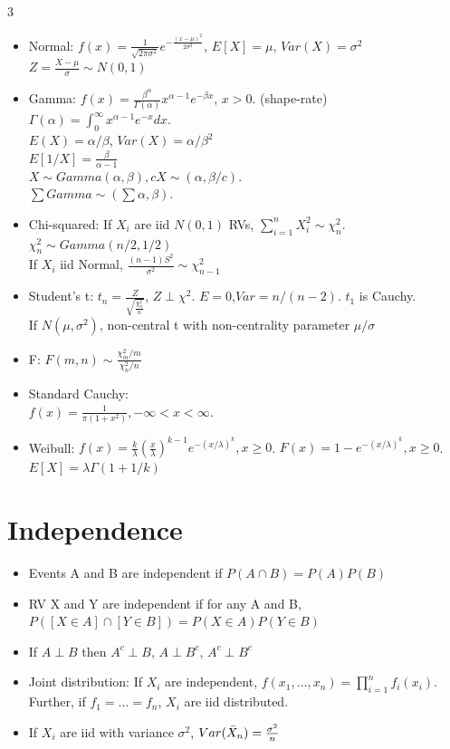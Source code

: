 \documentclass[a4paper,10pt]{article}
\begin{document}
\begin{multicols}{3}
\begin{itemize}
    \item Normal: $f(x)=\frac{1}{\sqrt{2\pi\sigma^2}}e^{-\frac{(x-\mu)^2}{2\sigma^2}}$, $E[X]=\mu$, $Var(X)=\sigma^2$\\
    $Z=\frac{X-\mu}{\sigma}\sim N(0,1)$
    \item Gamma: $f(x)=\frac{\beta^\alpha}{ \Gamma(\alpha)}x^{\alpha-1}e^{-\beta x}$, $x>0$. (shape-rate)\\ $\Gamma(\alpha)=\int_0^\infty x^{\alpha-1}e^{-x}dx$.\\
    $E(X)=\alpha/\beta$, $Var(X)=\alpha/{\beta^2}$\\
    $E[1/X]=\frac{\beta}{\alpha-1}$\\
    $X\sim Gamma(\alpha, \beta),cX\sim(\alpha,\beta/c)$.\\
    $\sum Gamma\sim(\sum \alpha,\beta)$.
    \item Chi-squared: If $X_i$ are iid $N(0,1)$ RVs, $\sum_{i=1}^nX_i^2\sim \chi_n^2$. $\chi_n^2\sim Gamma(n/2,1/2)$\\
    If $X_i$ iid Normal, $\frac{(n-1)S^2}{\sigma^2}\sim \chi_{n-1}^2$
    \item Student's t: $t_n=\frac{Z}{\sqrt{\frac{\chi^2_n}{n}}}$, $Z\perp \chi^2$. $E=0$,$Var=n/(n-2)$. $t_1$ is Cauchy.\\
    If $N(\mu,\sigma^2)$, non-central t with non-centrality parameter $\mu/\sigma$
    \item F: $F(m,n)\sim \frac{\chi^2_m/m}{\chi^2_n/n}$
    \item Standard Cauchy:\\ $f(x)=\frac{1}{\pi (1+x^2)},-\infty<x<\infty$. 
    \item Weibull: $f(x)=\frac{k}{\lambda}(\frac{x}{\lambda})^{k-1}e^{-(x/\lambda)^k},x\ge 0$. $F(x)=1-e^{-(x/\lambda)^k},x\ge 0$. $E[X]=\lambda \Gamma (1+1/k)$
\end{itemize}


\section*{Independence}
\begin{itemize}
    \item Events A and B are independent if $P(A\cap B)=P(A)P(B)$
    \item RV X and Y are independent if for any A and B, $P([X\in A]\cap[Y \in B])=P(X\in A)P(Y\in B)$
    \item If $A\perp B$ then $A^c \perp B$, $A \perp B^c$, $A^c \perp B^c$
    \item Joint distribution: If $X_i$ are independent, $f(x_1,...,x_n)=\prod_{i=1}^nf_i(x_i)$. Further, if $f_1=...=f_n$, $X_i$ are iid distributed.
    \item If $X_i$ are iid with variance $\sigma^2$, $Var(\Bar{X}_n)=\frac{\sigma^2}{n}$
    

\end{itemize}
\end{multicols}
\end{document}
